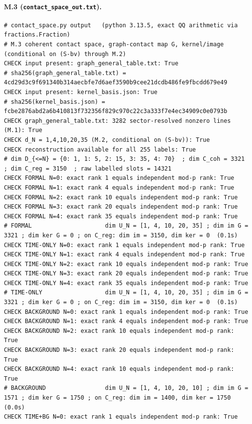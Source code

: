\documentclass{article}
\theoremstyle{remark}
\begin{document}
\paragraph{M.3 (\texttt{contact\_space\_out.txt}).}
\begin{lstlisting}
# contact_space.py output   (python 3.13.5, exact QQ arithmetic via fractions.Fraction)
# M.3 coherent contact space, graph-contact map G, kernel/image (conditional on (S-bv) through M.2)
CHECK input present: graph_general_table.txt: True
# sha256(graph_general_table.txt) = 4cd29d3c9f691340b314aecbfe7d6aef3590b9cee21dcdb486fe9fbcdd679e49
CHECK input present: kernel_basis.json: True
# sha256(kernel_basis.json) = fcbe2876abd2a6b410813f732356f829c970c22c3a333f7e4ec34909c0e0793b
CHECK graph_general_table.txt: 3282 sector-resolved nonzero lines (M.1): True
CHECK d_N = 1,4,10,20,35 (M.2, conditional on (S-bv)): True
CHECK reconstruction available for all 255 labels: True
# dim D_{<=N} = {0: 1, 1: 5, 2: 15, 3: 35, 4: 70}  ; dim C_coh = 3321  ; dim C_reg = 3150  ; raw labelled slots = 14321
CHECK FORMAL N=0: exact rank 1 equals independent mod-p rank: True
CHECK FORMAL N=1: exact rank 4 equals independent mod-p rank: True
CHECK FORMAL N=2: exact rank 10 equals independent mod-p rank: True
CHECK FORMAL N=3: exact rank 20 equals independent mod-p rank: True
CHECK FORMAL N=4: exact rank 35 equals independent mod-p rank: True
# FORMAL                     dim U_N = [1, 4, 10, 20, 35] ; dim im G = 3321 ; dim ker G = 0 ; on C_reg: dim im = 3150, dim ker = 0  (0.1s)
CHECK TIME-ONLY N=0: exact rank 1 equals independent mod-p rank: True
CHECK TIME-ONLY N=1: exact rank 4 equals independent mod-p rank: True
CHECK TIME-ONLY N=2: exact rank 10 equals independent mod-p rank: True
CHECK TIME-ONLY N=3: exact rank 20 equals independent mod-p rank: True
CHECK TIME-ONLY N=4: exact rank 35 equals independent mod-p rank: True
# TIME-ONLY                  dim U_N = [1, 4, 10, 20, 35] ; dim im G = 3321 ; dim ker G = 0 ; on C_reg: dim im = 3150, dim ker = 0  (0.1s)
CHECK BACKGROUND N=0: exact rank 1 equals independent mod-p rank: True
CHECK BACKGROUND N=1: exact rank 4 equals independent mod-p rank: True
CHECK BACKGROUND N=2: exact rank 10 equals independent mod-p rank: True
CHECK BACKGROUND N=3: exact rank 20 equals independent mod-p rank: True
CHECK BACKGROUND N=4: exact rank 10 equals independent mod-p rank: True
# BACKGROUND                 dim U_N = [1, 4, 10, 20, 10] ; dim im G = 1571 ; dim ker G = 1750 ; on C_reg: dim im = 1400, dim ker = 1750  (0.0s)
CHECK TIME+BG N=0: exact rank 1 equals independent mod-p rank: True

\end{lstlisting}
\end{document}
